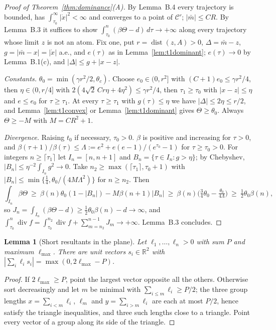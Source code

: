 \documentclass[11pt]{article}
\newtheorem{lemma}[theorem]{Lemma}
\theoremstyle{definition}
\theoremstyle{remark}
\newcommand{\R}{\mathbb R}
\DeclareMathOperator{\dist}{dist}
\begin{document}
\begin{proof}[Proof of Theorem~\ref{thm:dominance}(A)]
By Lemma~B.4 every trajectory is bounded, has $\int_{\tau_0}^\infty|\dot x|^2<\infty$ and converges to a
point of $\mathcal C'$; $|\bar m|\le CR$. By Lemma~B.3 it suffices to show
$\int_{\tau_0}^n(\beta\Theta-d)\,d\tau\to+\infty$ along every trajectory whose limit $z$ is not an atom.
Fix one, put $r=\dist(z,A)>0$, $\Delta=\bar m-z$, $g=|\bar m-x|=|\dot x|$ a.e., and $e(\tau)$ as in
Lemma~\ref{lem:t1dominant}; $e(\tau)\to0$ by Lemma~B.1(c), and $|\Delta|\le g+|x-z|$.

\emph{Constants.} $\theta_0=\min(\gamma r^2/2,\theta_c)$. Choose $e_0\in(0,r^2]$ with
$(C+1)e_0\le\gamma r^2/4$, then $\eta\in(0,r/4]$ with $2(4\sqrt2\,Cr\eta+4\eta^2)\le\gamma r^2/4$, then
$\tau_1\ge\tau_0$ with $|x-z|\le\eta$ and $e\le e_0$ for $\tau\ge\tau_1$. At every $\tau\ge\tau_1$ with
$g(\tau)\le\eta$ we have $|\Delta|\le2\eta\le r/2$, and Lemma~\ref{lem:t1convex} or
Lemma~\ref{lem:t1dominant} gives $\Theta\ge\theta_0$. Always $\Theta\ge-M$ with $M=CR^2+1$.

\emph{Divergence.} Raising $t_0$ if necessary, $\tau_0>0$. $\beta$ is positive and increasing for
$\tau>0$, and
$\beta(\tau+1)/\beta(\tau)\le\Lambda:=e^2+e(e-1)/(e^{\tau_0}-1)$ for $\tau\ge\tau_0>0$. For integers
$n\ge\lceil\tau_1\rceil$ let $I_n=[n,n+1]$ and $B_n=\{\tau\in I_n:g>\eta\}$; by Chebyshev,
$|B_n|\le\eta^{-2}\int_{I_n}g^2\to0$. Take $n_2\ge\max(\lceil\tau_1\rceil,\tau_0+1)$ with
$|B_n|\le\min\{\frac14,\theta_0/(4M\Lambda^2)\}$ for $n\ge n_2$. Then
\[
\int_{I_n}\beta\Theta\ \ge\ \beta(n)\theta_0(1-|B_n|)-M\beta(n+1)|B_n|
\ \ge\ \beta(n)\Big(\tfrac34\theta_0-\tfrac{\theta_0}{4\Lambda}\Big)\ \ge\ \tfrac12\theta_0\beta(n),
\]
so $J_n=\int_{I_n}(\beta\Theta-d)\ge\frac12\theta_0\beta(n)-d\to\infty$, and
$\int_{\tau_0}^n\operatorname{div}f=\int_{\tau_0}^{n_2}\operatorname{div}f+\sum_{m=n_2}^{n-1}J_m\to+\infty$.
Lemma~B.3 concludes.
\end{proof}

\begin{lemma}[Short resultants in the plane]\label{lem:t1polygon}
Let $\ell_1,\dots,\ell_n>0$ with sum $P$ and maximum $\ell_{\max}$. There are unit vectors
$s_i\in\R^2$ with $|\sum_i\ell_is_i|=\max(0,2\ell_{\max}-P)$.
\end{lemma}
\begin{proof}
If $2\ell_{\max}\ge P$, point the largest vector opposite all the others. Otherwise sort decreasingly
and let $m$ be minimal with $\sum_{i\le m}\ell_i\ge P/2$; the three group lengths
$x=\sum_{i<m}\ell_i$, $\ell_m$ and $y=\sum_{i>m}\ell_i$ are each at most $P/2$, hence satisfy the
triangle inequalities, and three such lengths close to a triangle. Point every vector of a group
along its side of the triangle.
\end{proof}
\end{document}
